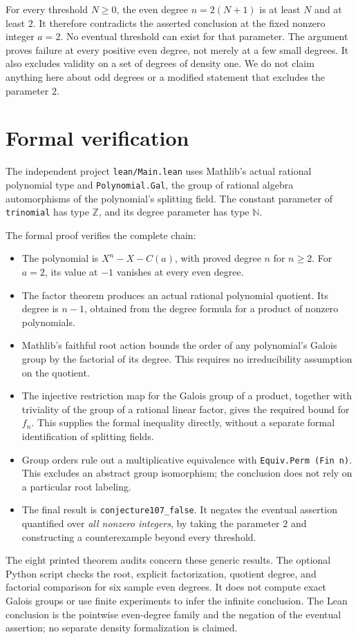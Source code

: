 \documentclass[11pt]{article}
\newcommand{\Z}{\mathbb Z}
\begin{document}
For every threshold $N\ge0$, the even degree $n=2(N+1)$ is at least $N$ and at least $2$. It therefore contradicts the asserted conclusion at the fixed nonzero integer $a=2$. No eventual threshold can exist for that parameter. The argument proves failure at every positive even degree, not merely at a few small degrees. It also excludes validity on a set of degrees of density one. We do not claim anything here about odd degrees or a modified statement that excludes the parameter $2$.

\section*{Formal verification}
The independent project \texttt{lean/Main.lean} uses Mathlib's actual rational polynomial type and \texttt{Polynomial.Gal}, the group of rational algebra automorphisms of the polynomial's splitting field. The constant parameter of \texttt{trinomial} has type $\Z$, and its degree parameter has type $\mathbb N$.

The formal proof verifies the complete chain:
\begin{itemize}
\item The polynomial is $X^n-X-C(a)$, with proved degree $n$ for $n\ge2$. For $a=2$, its value at $-1$ vanishes at every even degree.
\item The factor theorem produces an actual rational polynomial quotient. Its degree is $n-1$, obtained from the degree formula for a product of nonzero polynomials.
\item Mathlib's faithful root action bounds the order of any polynomial's Galois group by the factorial of its degree. This requires no irreducibility assumption on the quotient.
\item The injective restriction map for the Galois group of a product, together with triviality of the group of a rational linear factor, gives the required bound for $f_n$. This supplies the formal inequality directly, without a separate formal identification of splitting fields.
\item Group orders rule out a multiplicative equivalence with \texttt{Equiv.Perm (Fin n)}. This excludes an abstract group isomorphism; the conclusion does not rely on a particular root labeling.
\item The final result is \texttt{conjecture107\_false}. It negates the eventual assertion quantified over \emph{all nonzero integers}, by taking the parameter $2$ and constructing a counterexample beyond every threshold.
\end{itemize}
The eight printed theorem audits concern these generic results. The optional Python script checks the root, explicit factorization, quotient degree, and factorial comparison for six sample even degrees. It does not compute exact Galois groups or use finite experiments to infer the infinite conclusion. The Lean conclusion is the pointwise even-degree family and the negation of the eventual assertion; no separate density formalization is claimed.
\end{document}
